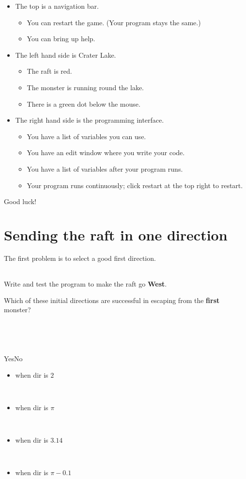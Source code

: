 \documentclass[titlepage]{article}
\newcommand{\tickbox}{\raisebox{-2pt}{\shadowbox{\parbox{4pt}{~}}}}
\newcommand{\drawbox}[1]{\noindent\shadowbox{\parbox{\linewidth-8pt}{\vspace{#1em}~}}\newline}
\newcommand{\truefalse}{\dotfill\parbox{50pt}{~\tickbox{}~~~~~\tickbox{}~}}
\begin{document}
\begin{itemize}
\item The top is a navigation bar.
\begin{itemize}
\item You can restart the game. (Your program stays the same.)
\item You can bring up help.
\end{itemize}
\item The left hand side is Crater Lake.
\begin{itemize}
\item The raft is red.
\item The monster is running round the lake.
\item There is a green dot below the mouse.
\end{itemize}
\item The right hand side is the programming interface.
\begin{itemize}
\item You have a list of variables you can use.
\item You have an edit window where you write your code.
\item You have a list of variables after your program runs.
\item Your program runs continuously; click restart at the top right to restart.
\end{itemize} 
\end{itemize}

Good luck!

\newpage
\section{Sending the raft in one direction}

The first problem is to select a good first direction.

~\\
\noindent
Write and test the program to make the raft go {\bf West}.

\drawbox{4}

\noindent
Which of these initial directions are successful in escaping from the {\bf first} monster?

\parbox{10pt}{~}\ ~~~ \hfill\parbox{50pt}{Yes\hfill{}No~~~}
\begin{itemize}
\item when dir is $2$            \truefalse{}
\item when dir is $\pi$          \truefalse{}
\item when dir is $3.14$         \truefalse{}
\item when dir is $\pi - 0.1$    \truefalse{}
\end{itemize}
\end{document}
